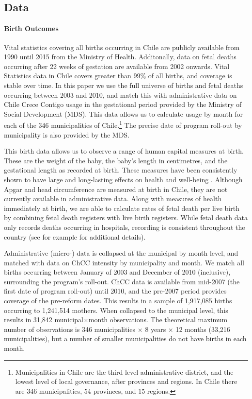 \documentclass[12pt]{article}
\begin{document}
\begin{spacing}{1.4}
\section{Data}
\label{scn:data}
\paragraph{Birth Outcomes} Vital statistics covering all births
occurring in Chile are publicly available from 1990 until 2015 from
the Ministry of Health. Additonally, data on fetal deaths occurring
after 22 weeks of gestation are available from 2002 onwards. Vital
Statistics data in Chile covers greater than 99\% of all births,
and coverage is stable over time.  In this paper we use the full
universe of births and fetal deaths occurring between 2003 and
2010, and match this with administrative data
on Chile Crece Contigo usage in the gestational period provided
by the Ministry of Social Development (MDS).  This data allows us
to calculate usage by month for each of the 346 municipalities of
Chile.\footnote{Municipalities in Chile are the third level
  administrative district, and the lowest level of local
  governance, after provinces and regions.  In Chile there are
  346 municipalities, 54 provinces, and 15 regions.}  The precise
date of program roll-out by municipality is also provided by the
MDS.

This birth data allows us to observe a range of human capital measures
at birth.  These are the weight of the baby, the baby's length
in centimetres, and the gestational length as recorded at birth. These
measures have been consistently shown to have large and long-lasting
effects on health and well-being \citep{AlmondCurrie2011b}.
Although Apgar and head circumference are measured at birth in
Chile, they are not currently available in administrative data.
Along with measures of health immediately at birth, we are able
to calculate rates of fetal death per live birth by combining
fetal death registers with live birth registers.  While fetal death
data only records deaths occurring in hospitals, recording is
consistent throughout the country (see for example
\citet[p.\ 22]{Rauetal2017} for additional details).  

Administrative (micro-) data is collapsed at the municipal by
month level, and matched with data on ChCC intensity by municipality
and month.  We match all births occurring between January of 2003
and December of 2010 (inclusive), surrounding the program's roll-out.
ChCC data is available from mid-2007 (the first date of program
roll-out) until 2010, and the pre-2007 period provides coverage of
the pre-reform dates.  This results in a sample of 1,917,085 births
occurring to 1,241,514 mothers. When collapsed to the municipal
level, this results in 31,842 municipal$\times$month observations.
The theoretical maximum number of observations is 346 municipalities
$\times$ 8 years $\times$ 12 months (33,216 municipalities), but a
number of smaller municipalities do not have births in each month.


\end{spacing}
\end{document}
